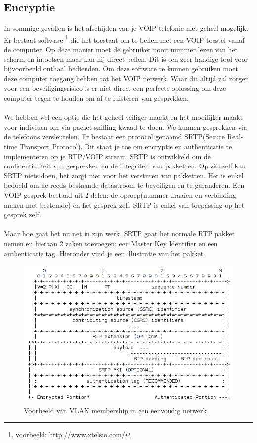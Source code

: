 \documentclass[pdftex,a4paper,12pt,twoside]{report}
\begin{document}
\subsection{Encryptie}
In sommige gevallen is het afschijden van je VOIP telefonie niet geheel mogelijk. Er bestaat software \footnote{voorbeeld: http://www.xtelsio.com/} die het toestaat om te bellen met een VOIP toestel vanaf de computer. Op deze manier moet de gebruiker nooit nummer lezen van het scherm en intoetsen maar kan hij direct bellen. Dit is een zeer handige tool voor bijvoorbeeld onthaal bedienden. Om deze software te kunnen gebruiken moet deze computer toegang hebben tot het VOIP netwerk. Waar dit altijd zal zorgen voor een beveiligingsrisico is er niet direct een perfecte oplossing om deze computer tegen te houden om af te luisteren van gesprekken. \\ \\
We hebben wel een optie die het geheel veiliger maakt en het moeilijker maakt voor indiviuen om via packet sniffing kwaad te doen. We kunnen gesprekken via de telefoons versleutelen. Er bestaat een protocol genaamd SRTP(Secure Real-time Transport Protocol). Dit staat je toe om encryptie en authenticatie te implementeren op je RTP/VOIP stream. SRTP is ontwikkeld om de confidentialiteit van gesprekken en de integriteit van pakketten. Op zichzelf kan SRTP niets doen, het zorgt niet voor het versturen van pakketten. Het is enkel bedoeld om de reeds bestaande datastroom te beveiligen en te garanderen. Een VOIP gesprek bestaad uit 2 delen: de oproep(nummer draaien en verbinding maken met bestemde) en het gesprek zelf. SRTP is enkel van toepassing op het gesprek zelf. \\ \\
Maar hoe gaat het nu net in zijn werk. SRTP gaat het normale RTP pakket nemen en hieraan 2 zaken toevoegen: een Master Key Identifier en een authenticatie tag. Hieronder vind je een illustratie van het pakket. 
\newpage

\begin{figure}[H]
\caption{Voorbeeld van VLAN membership in een eenvoudig netwerk \protect \footnotemark}
\includegraphics[scale=0.8]{img/SRTP}
\end{figure}
\end{document}
